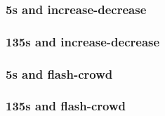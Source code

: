 \subsubsection{5s and increase-decrease}



\subsubsection{135s and increase-decrease}



\subsubsection{5s and flash-crowd}



\subsubsection{135s and flash-crowd}


